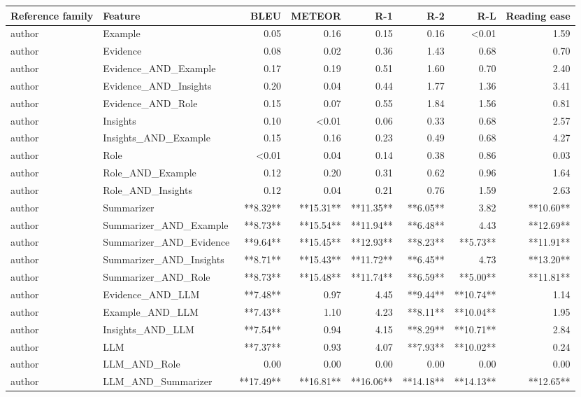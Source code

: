 \begin{tabular}{llrrrrrr}
\toprule
Reference family & Feature & BLEU & METEOR & R-1 & R-2 & R-L & Reading ease \\
\midrule
author & Example & 0.05 & 0.16 & 0.15 & 0.16 & <0.01 & 1.59 \\
author & Evidence & 0.08 & 0.02 & 0.36 & 1.43 & 0.68 & 0.70 \\
author & Evidence_AND_Example & 0.17 & 0.19 & 0.51 & 1.60 & 0.70 & 2.40 \\
author & Evidence_AND_Insights & 0.20 & 0.04 & 0.44 & 1.77 & 1.36 & 3.41 \\
author & Evidence_AND_Role & 0.15 & 0.07 & 0.55 & 1.84 & 1.56 & 0.81 \\
author & Insights & 0.10 & <0.01 & 0.06 & 0.33 & 0.68 & 2.57 \\
author & Insights_AND_Example & 0.15 & 0.16 & 0.23 & 0.49 & 0.68 & 4.27 \\
author & Role & <0.01 & 0.04 & 0.14 & 0.38 & 0.86 & 0.03 \\
author & Role_AND_Example & 0.12 & 0.20 & 0.31 & 0.62 & 0.96 & 1.64 \\
author & Role_AND_Insights & 0.12 & 0.04 & 0.21 & 0.76 & 1.59 & 2.63 \\
author & Summarizer & **8.32** & **15.31** & **11.35** & **6.05** & 3.82 & **10.60** \\
author & Summarizer_AND_Example & **8.73** & **15.54** & **11.94** & **6.48** & 4.43 & **12.69** \\
author & Summarizer_AND_Evidence & **9.64** & **15.45** & **12.93** & **8.23** & **5.73** & **11.91** \\
author & Summarizer_AND_Insights & **8.71** & **15.43** & **11.72** & **6.45** & 4.73 & **13.20** \\
author & Summarizer_AND_Role & **8.73** & **15.48** & **11.74** & **6.59** & **5.00** & **11.81** \\
author & Evidence_AND_LLM & **7.48** & 0.97 & 4.45 & **9.44** & **10.74** & 1.14 \\
author & Example_AND_LLM & **7.43** & 1.10 & 4.23 & **8.11** & **10.04** & 1.95 \\
author & Insights_AND_LLM & **7.54** & 0.94 & 4.15 & **8.29** & **10.71** & 2.84 \\
author & LLM & **7.37** & 0.93 & 4.07 & **7.93** & **10.02** & 0.24 \\
author & LLM_AND_Role & 0.00 & 0.00 & 0.00 & 0.00 & 0.00 & 0.00 \\
author & LLM_AND_Summarizer & **17.49** & **16.81** & **16.06** & **14.18** & **14.13** & **12.65** \\

\end{tabular}
